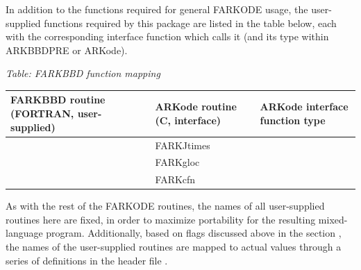 \documentclass[letterpaper,10pt,english]{sphinxmanual}
\begin{document}
In addition to the functions required for general FARKODE usage, the
user-supplied functions required by this package are listed in the
table below, each with the corresponding interface function which
calls it (and its type within ARKBBDPRE or ARKode).

\emph{Table: FARKBBD function mapping}

\begin{tabulary}{\linewidth}{|L|L|L|}
\hline
\textsf{\relax 
FARKBBD routine
(FORTRAN, user-supplied)
} & \textsf{\relax 
ARKode routine
(C, interface)
} & \textsf{\relax 
ARKode interface
function type
}\\
\hline
{\hyperref[f_interface/Usage:f/_/FARKJTIMES]{\emph{}}}
 & 
FARKJtimes
 & 
{\hyperref[c_interface/User_supplied:c.ARKSpilsJacTimesVecFn]{\emph{}}}
\\
\hline
{\hyperref[f_interface/Preconditioning:f/_/FARKGLOCFN]{\emph{}}}
 & 
FARKgloc
 & 
{\hyperref[c_interface/Preconditioners:c.ARKLocalFn]{\emph{}}}
\\
\hline
{\hyperref[f_interface/Preconditioning:f/_/FARKCOMMFN]{\emph{}}}
 & 
FARKcfn
 & 
{\hyperref[c_interface/Preconditioners:c.ARKCommFn]{\emph{}}}
\\
\hline\end{tabulary}


As with the rest of the FARKODE routines, the names of all
user-supplied routines here are fixed, in order to maximize
portability for the resulting mixed-language program.  Additionally,
based on flags discussed above in the section {\hyperref[f_interface/Routines:finterface-routines]{\emph{}}},
the names of the user-supplied routines are mapped to actual values
through a series of definitions in the header file .
\end{document}
